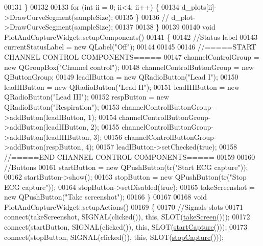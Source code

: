 \begin{DoxyCode}
00131     \}
00132 
00133     \textcolor{keywordflow}{for} (\textcolor{keywordtype}{int} ii = 0; ii<4; ii++) \{
00134         d\_plots[ii]->DrawCurveSegment(sampleSize);
00135     \}
00136 \textcolor{comment}{//    d\_plot->DrawCurveSegment(sampleSize);}
00137 
00138 \}
00139 
00140 \textcolor{keywordtype}{void} PlotAndCaptureWidget::setupComponents()
00141 \{
00142     \textcolor{comment}{//Status label}
00143     currentStatusLabel = \textcolor{keyword}{new} QLabel(\textcolor{stringliteral}{"Off"});
00144 
00145 
00146     \textcolor{comment}{//=====START CHANNEL CONTROL COMPONENTS=====}
00147     channelControlGroup = \textcolor{keyword}{new} QGroupBox(\textcolor{stringliteral}{"Channel control"});
00148     channelControlButtonGroup = \textcolor{keyword}{new} QButtonGroup;
00149     leadIButton = \textcolor{keyword}{new} QRadioButton(\textcolor{stringliteral}{"Lead I"});
00150     leadIIButton = \textcolor{keyword}{new} QRadioButton(\textcolor{stringliteral}{"Lead II"});
00151     leadIIIButton = \textcolor{keyword}{new} QRadioButton(\textcolor{stringliteral}{"Lead III"});
00152     respButton = \textcolor{keyword}{new} QRadioButton(\textcolor{stringliteral}{"Respiration"});
00153     channelControlButtonGroup->addButton(leadIButton, 1);
00154     channelControlButtonGroup->addButton(leadIIButton, 2);
00155     channelControlButtonGroup->addButton(leadIIIButton, 3);
00156     channelControlButtonGroup->addButton(respButton, 4);
00157     leadIButton->setChecked(\textcolor{keyword}{true});
00158     \textcolor{comment}{//=====END CHANNEL CONTROL COMPONENTS=====}
00159 
00160     \textcolor{comment}{//Buttons}
00161     startButton = \textcolor{keyword}{new} QPushButton(tr(\textcolor{stringliteral}{"Start ECG capture"}));
00162     startButton->show();
00163     stopButton = \textcolor{keyword}{new} QPushButton(tr(\textcolor{stringliteral}{"Stop ECG capture"}));
00164     stopButton->setDisabled(\textcolor{keyword}{true});
00165     takeScreenshot = \textcolor{keyword}{new} QPushButton(\textcolor{stringliteral}{"Take screenshot"});
00166 \}
00167 
00168 \textcolor{keywordtype}{void} PlotAndCaptureWidget::setupActions()
00169 \{
00170     \textcolor{comment}{//Signals-slots}
00171     connect(takeScreenshot, SIGNAL(clicked()), \textcolor{keyword}{this}, SLOT(\hyperlink{classPlotAndCaptureWidget_a77ecf5a130215ce0246b8817e44081f7}{takeScreen}()));
00172     connect(startButton, SIGNAL(clicked()), \textcolor{keyword}{this}, SLOT(\hyperlink{classPlotAndCaptureWidget_a232d01f00a25365382f094ad8eedb7fa}{startCapture}()));
00173     connect(stopButton, SIGNAL(clicked()), \textcolor{keyword}{this}, SLOT(\hyperlink{classPlotAndCaptureWidget_a5f9fe948c3683ae9026a8f792782e67e}{stopCapture}()));

\end{DoxyCode}
